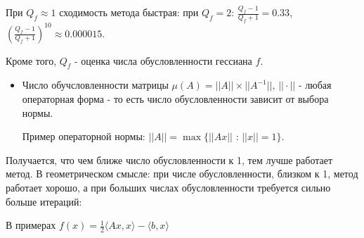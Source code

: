 При $Q_f \approx 1$ сходимость метода быстрая: при $Q_f = 2 $:
$\frac{Q_f - 1}{Q_f + 1} = 0.33$,
$\left(
    \frac{Q_f - 1}{Q_f + 1}
\right)^{10} \approx 0.000015$.

Кроме того,
$Q_f$ - оценка числа обусловленности гессиана $f$.

\begin{itemize}
    \item  Число обучсловленности матрицы
$\mu(A) = ||A|| \times ||A^{-1}||$,     $||\cdot||$ - любая операторная форма - то есть число обусловленности зависит от выбора нормы.

Пример операторной нормы:
$||A|| = \max \{ ||Ax|| \text{ : } ||x|| = 1 \}$.
\end{itemize}


Получается, что чем ближе число обусловленности к 1, тем лучше работает метод.
В геометрическом смысле: при числе обусловленности, близком к 1, метод работает хорошо, а при больших числах обусловленности требуется сильно больше итераций:

В примерах $f(x) = \frac{1}{2} \langle Ax,x \rangle - \langle b,x \rangle$

